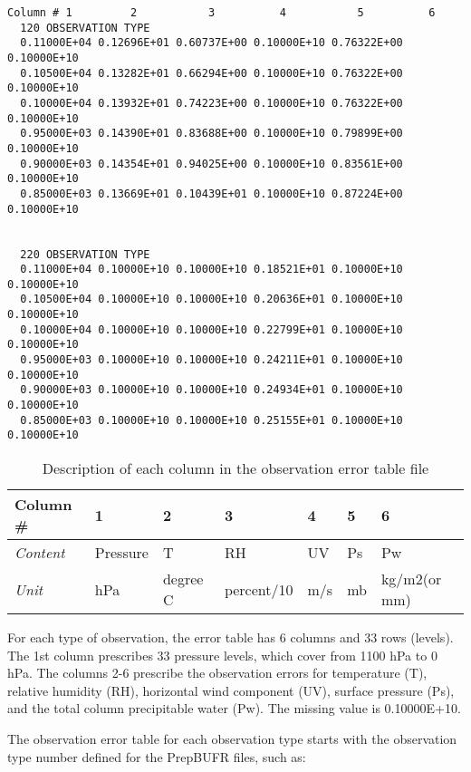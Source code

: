 \begin{scriptsize}
\begin{verbatim}
Column # 1         2           3          4           5          6
  120 OBSERVATION TYPE
  0.11000E+04 0.12696E+01 0.60737E+00 0.10000E+10 0.76322E+00 0.10000E+10
  0.10500E+04 0.13282E+01 0.66294E+00 0.10000E+10 0.76322E+00 0.10000E+10
  0.10000E+04 0.13932E+01 0.74223E+00 0.10000E+10 0.76322E+00 0.10000E+10
  0.95000E+03 0.14390E+01 0.83688E+00 0.10000E+10 0.79899E+00 0.10000E+10
  0.90000E+03 0.14354E+01 0.94025E+00 0.10000E+10 0.83561E+00 0.10000E+10
  0.85000E+03 0.13669E+01 0.10439E+01 0.10000E+10 0.87224E+00 0.10000E+10


  220 OBSERVATION TYPE
  0.11000E+04 0.10000E+10 0.10000E+10 0.18521E+01 0.10000E+10 0.10000E+10
  0.10500E+04 0.10000E+10 0.10000E+10 0.20636E+01 0.10000E+10 0.10000E+10
  0.10000E+04 0.10000E+10 0.10000E+10 0.22799E+01 0.10000E+10 0.10000E+10
  0.95000E+03 0.10000E+10 0.10000E+10 0.24211E+01 0.10000E+10 0.10000E+10
  0.90000E+03 0.10000E+10 0.10000E+10 0.24934E+01 0.10000E+10 0.10000E+10
  0.85000E+03 0.10000E+10 0.10000E+10 0.25155E+01 0.10000E+10 0.10000E+10

\end{verbatim}
\end{scriptsize}

\begin{table}[htbp]
\centering
\caption{Description of each column in the observation error table file}
\begin{tabular}{|p{2cm}|p{2cm}|p{2cm}|p{2cm}|p{1cm}|p{1cm}|p{2.5cm}|}
\hline
\hline
 Column \# & 1 & 2 & 3 & 4 & 5 & 6  \\
\hline
\textit{Content} & Pressure & T & RH & UV & Ps & Pw \\
\hline
\textit{Unit} & hPa & degree C & percent/10 & m/s & mb & kg/m2(or mm)\\
\hline
\end{tabular}
\label{tab410}
\end{table} 


For each type of observation, the error table has 6 columns and 33 rows (levels). The 1st column prescribes 33 pressure levels, which cover from 1100 hPa to 0 hPa. The columns 2-6 prescribe the observation errors for temperature (T), relative humidity (RH), horizontal wind component (UV), surface pressure (Ps), and the total column precipitable water (Pw). The missing value is 0.10000E+10. 

The observation error table for each observation type starts with the observation type number defined for the PrepBUFR files, such as:

